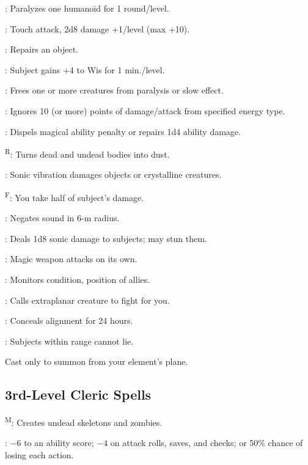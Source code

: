 : Paralyzes one humanoid for 1 round/level.

: Touch attack, 2d8 damage +1/level (max +10).

: Repairs an object.

: Subject gains +4 to Wis for 1 min./level.

: Frees one or more creatures from paralysis or slow effect.

: Ignores 10 (or more) points of damage/attack from specified energy type.

: Dispels magical ability penalty or repairs 1d4 ability damage.

\textsuperscript{R}: Turns dead and undead bodies into dust. %

: Sonic vibration damages objects or crystalline creatures.

\textsuperscript{F}: You take half of subject's damage.

: Negates sound in 6-m radius.

: Deals 1d8 sonic damage to subjects; may stun them.

: Magic weapon attacks on its own.

: Monitors condition, position of allies.

\footnotemark[1]: Calls extraplanar creature to fight for you.

: Conceals alignment for 24 hours.

: Subjects within range cannot lie.

 Cast only to summon from your element's plane.



\subsection{3rd-Level Cleric Spells}

\textsuperscript{M}: Creates undead skeletons and zombies.

: $-6$ to an ability score; $-4$ on attack rolls, saves, and checks; or 50\% chance of losing each action.

